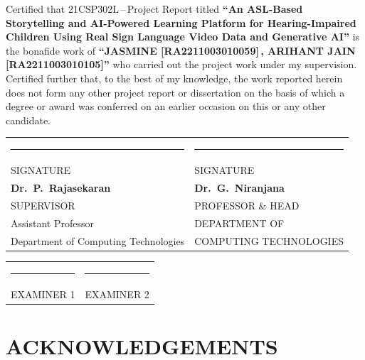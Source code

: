 \documentclass[12pt,a4paper,oneside]{report}
\begin{document}
\vspace{0.6cm}
\noindent Certified that 21CSP302L\,--\,Project Report titled \textbf{``An ASL-Based Storytelling and AI-Powered Learning Platform for Hearing-Impaired Children Using Real Sign Language Video Data and Generative AI''} is the bonafide work of \textbf{``JASMINE [RA2211003010059]\,, ARIHANT JAIN [RA2211003010105]''} who carried out the project work under my supervision. Certified further that, to the best of my knowledge, the work reported herein does not form any other project report or dissertation on the basis of which a degree or award was conferred on an earlier occasion on this or any other candidate.

\vspace{2.5cm}
\noindent\begin{tabularx}{\linewidth}{@{}XX@{}}
\hfill\rule{5cm}{0.4pt}\hfill & \hfill\rule{5cm}{0.4pt}\hfill \\[0.2em]
\hfill SIGNATURE\hfill & \hfill SIGNATURE\hfill \\[1.2em]
\hfill\textbf{Dr.\ P.\ Rajasekaran}\hfill & \hfill\textbf{Dr.\ G.\ Niranjana}\hfill \\
\hfill SUPERVISOR\hfill & \hfill PROFESSOR \& HEAD\hfill \\
\hfill Assistant Professor\hfill & \hfill DEPARTMENT OF\hfill \\
\hfill Department of Computing Technologies\hfill & \hfill COMPUTING TECHNOLOGIES\hfill \\
\end{tabularx}

\vspace{2.5cm}
\noindent\begin{tabularx}{\linewidth}{@{}XX@{}}
\hfill\rule{5cm}{0.4pt}\hfill & \hfill\rule{5cm}{0.4pt}\hfill \\[0.2em]
\hfill EXAMINER 1\hfill & \hfill EXAMINER 2\hfill \\
\end{tabularx}
\clearpage

\setcounter{page}{1}

\chapter*{ACKNOWLEDGEMENTS}
\end{document}
